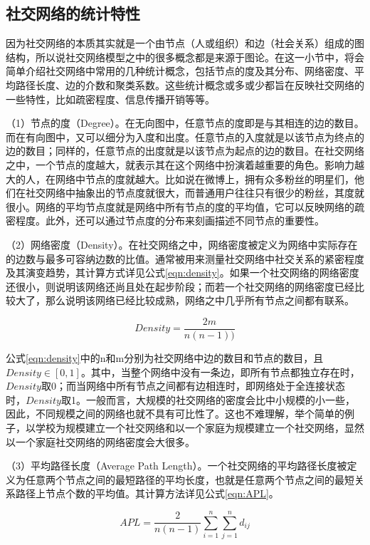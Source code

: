 \subsection{社交网络的统计特性}
因为社交网络的本质其实就是一个由节点（人或组织）和边（社会关系）组成的图结构，所以说社交网络模型之中的很多概念都是来源于图论。在这一小节中，将会简单介绍社交网络中常用的几种统计概念，包括节点的度及其分布、网络密度、平均路径长度、边的介数和聚类系数。这些统计概念或多或少都旨在反映社交网络的一些特性，比如疏密程度、信息传播开销等等。

（1）节点的度（Degree）。在无向图中，任意节点的度即是与其相连的边的数目。而在有向图中，又可以细分为入度和出度。任意节点的入度就是以该节点为终点的边的数目；同样的，任意节点的出度就是以该节点为起点的边的数目。在社交网络之中，一个节点的度越大，就表示其在这个网络中扮演着越重要的角色。影响力越大的人，在网络中节点的度就越大。比如说在微博上，拥有众多粉丝的明星们，他们在社交网络中抽象出的节点度就很大，而普通用户往往只有很少的粉丝，其度就很小。网络的平均节点度就是网络中所有节点的度的平均值，它可以反映网络的疏密程度。此外，还可以通过节点度的分布来刻画描述不同节点的重要性。

（2）网络密度（Density）。在社交网络之中，网络密度被定义为网络中实际存在的边数与最多可容纳边数的比值。通常被用来测量社交网络中社交关系的紧密程度及其演变趋势，其计算方式详见公式\ref{eqn:density}。如果一个社交网络的网络密度还很小，则说明该网络还尚且处在起步阶段；而若一个社交网络的网络密度已经比较大了，那么说明该网络已经比较成熟，网络之中几乎所有节点之间都有联系。

\begin{equation}
  \label{eqn:density}
  Density=\frac{2m}{n(n-1))} 
\end{equation}

公式\ref{eqn:density}中的n和m分别为社交网络中边的数目和节点的数目，且$Density\in [0,1]$。其中，当整个网络中没有一条边，即所有节点都独立存在时，$Density$取0；而当网络中所有节点之间都有边相连时，即网络处于全连接状态时，$Density$取1。一般而言，大规模的社交网络的密度会比中小规模的小一些，因此，不同规模之间的网络也就不具有可比性了。这也不难理解，举个简单的例子，以学校为规模建立一个社交网络和以一个家庭为规模建立一个社交网络，显然以一个家庭社交网络的网络密度会大很多。

（3）平均路径长度（Average Path Length）。一个社交网络的平均路径长度被定义为任意两个节点之间的最短路径的平均长度，也就是任意两个节点之间的最短关系路径上节点个数的平均值。其计算方法详见公式\ref{eqn:APL}。

\begin{equation}
  \label{eqn:APL}
  APL=\frac{2}{n(n-1)}\sum _{i=1}^{n}\sum_{j=1}^{n}d_{ij}
\end{equation}

